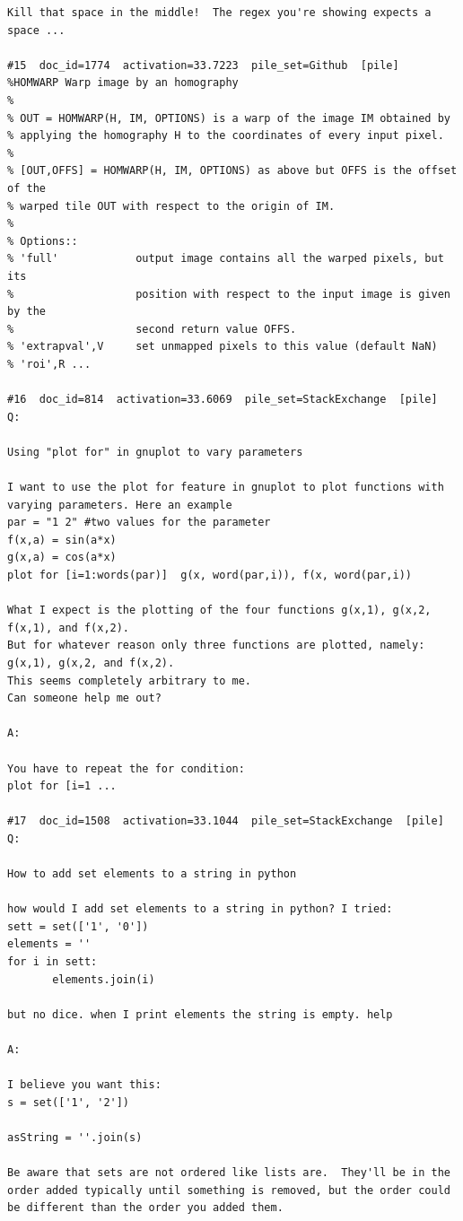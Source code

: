 \begin{verbatim}
Kill that space in the middle!  The regex you're showing expects a space ...

#15  doc_id=1774  activation=33.7223  pile_set=Github  [pile]
%HOMWARP Warp image by an homography
%
% OUT = HOMWARP(H, IM, OPTIONS) is a warp of the image IM obtained by 
% applying the homography H to the coordinates of every input pixel.
%
% [OUT,OFFS] = HOMWARP(H, IM, OPTIONS) as above but OFFS is the offset of the
% warped tile OUT with respect to the origin of IM.
%
% Options::
% 'full'            output image contains all the warped pixels, but its
%                   position with respect to the input image is given by the
%                   second return value OFFS.
% 'extrapval',V     set unmapped pixels to this value (default NaN)
% 'roi',R ...

#16  doc_id=814  activation=33.6069  pile_set=StackExchange  [pile]
Q:

Using "plot for" in gnuplot to vary parameters

I want to use the plot for feature in gnuplot to plot functions with varying parameters. Here an example
par = "1 2" #two values for the parameter
f(x,a) = sin(a*x)
g(x,a) = cos(a*x)
plot for [i=1:words(par)]  g(x, word(par,i)), f(x, word(par,i))

What I expect is the plotting of the four functions g(x,1), g(x,2, f(x,1), and f(x,2).
But for whatever reason only three functions are plotted, namely: g(x,1), g(x,2, and f(x,2).
This seems completely arbitrary to me.
Can someone help me out?

A:

You have to repeat the for condition:
plot for [i=1 ...

#17  doc_id=1508  activation=33.1044  pile_set=StackExchange  [pile]
Q:

How to add set elements to a string in python

how would I add set elements to a string in python? I tried:
sett = set(['1', '0'])
elements = ''
for i in sett:
       elements.join(i)

but no dice. when I print elements the string is empty. help

A:

I believe you want this:
s = set(['1', '2'])

asString = ''.join(s)

Be aware that sets are not ordered like lists are.  They'll be in the order added typically until something is removed, but the order could be different than the order you added them.




\end{verbatim}
